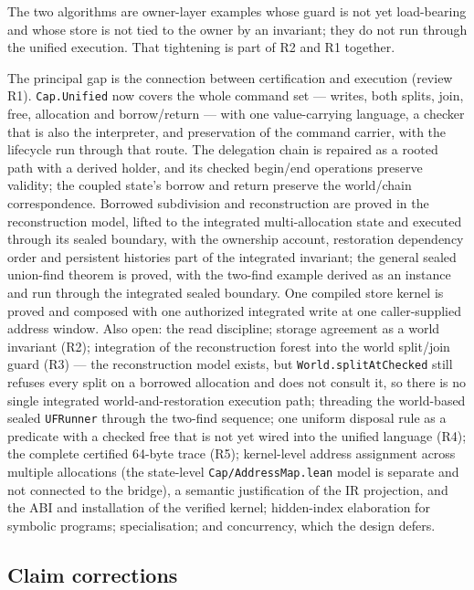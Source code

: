 \documentclass[10pt,a4paper]{article}
\newcommand{\file}[1]{\texttt{\small #1}}
\begin{document}
The two algorithms are owner-layer examples whose guard is not yet load-bearing and
whose store is not tied to the owner by an invariant; they do not run through the
unified execution. That tightening is part of R2 and R1 together.

The principal gap is the connection between certification and execution (review
R1). \texttt{Cap.Unified} now covers the whole command set --- writes, both
splits, join, free, allocation and borrow/return --- with one value-carrying
language, a checker that is also the interpreter, and preservation of the
command carrier, with the lifecycle run through that route. The delegation chain
is repaired as a rooted path with a derived holder, and its checked begin/end
operations preserve validity; the coupled state's borrow and return preserve the
world/chain correspondence. Borrowed subdivision and reconstruction are proved
in the reconstruction model, lifted to the integrated multi-allocation state and
executed through its sealed boundary, with the ownership account, restoration
dependency order and persistent histories part of the integrated invariant; the
general sealed union-find theorem is proved, with the two-find example derived as
an instance and run through the integrated sealed boundary. One compiled store
kernel is proved and composed with one authorized integrated write at one
caller-supplied address window. Also open: the read discipline;
storage agreement as a world invariant (R2); integration of the reconstruction
forest into the world split/join guard (R3) --- the reconstruction model exists,
but \texttt{World.splitAtChecked} still refuses every split on a borrowed
allocation and does not consult it, so there is no single integrated
world-and-restoration execution path; threading the world-based sealed
\texttt{UFRunner} through the two-find sequence; one uniform disposal rule as a
predicate with a checked free that is not yet wired into the unified language
(R4); the complete certified 64-byte trace (R5); kernel-level address assignment
across multiple
allocations (the state-level \file{Cap/AddressMap.lean} model is separate and not
connected to the bridge), a semantic justification of the IR projection, and the
ABI and installation of the verified kernel; hidden-index elaboration for
symbolic programs; specialisation; and concurrency, which the design defers.

\subsection*{Claim corrections}
\end{document}
